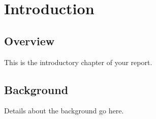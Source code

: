 \chapter{Introduction}
\section{Overview}
This is the introductory chapter of your report.

\section{Background}
Details about the background go here.
